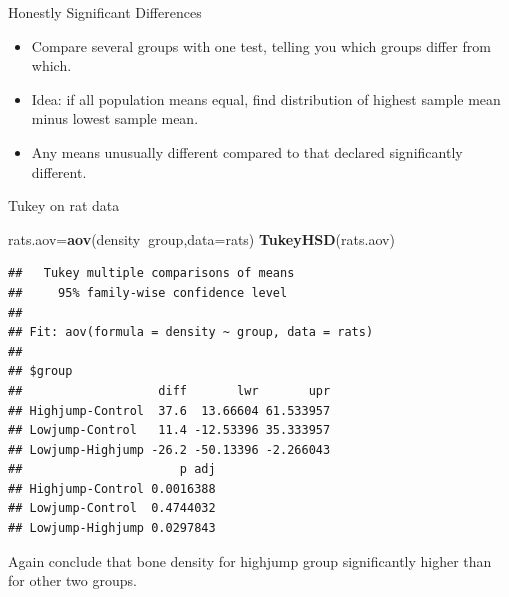 \documentclass[ignorenonframetext,]{beamer}
\newenvironment{Shaded}{\begin{snugshade}}{\end{snugshade}}
\newcommand{\DataTypeTok}[1]{\textcolor[rgb]{0.13,0.29,0.53}{#1}}
\newcommand{\KeywordTok}[1]{\textcolor[rgb]{0.13,0.29,0.53}{\textbf{#1}}}
\newcommand{\NormalTok}[1]{#1}
\newcommand{\OperatorTok}[1]{\textcolor[rgb]{0.81,0.36,0.00}{\textbf{#1}}}
\providecommand{\tightlist}{%
  \setlength{\itemsep}{0pt}\setlength{\parskip}{0pt}}
\begin{document}
\begin{frame}{Honestly Significant Differences}
\protect\hypertarget{honestly-significant-differences}{}

\begin{itemize}
\tightlist
\item
  Compare several groups with one test, telling you which groups differ
  from which.
\item
  Idea: if all population means equal, find distribution of highest
  sample mean minus lowest sample mean.
\item
  Any means unusually different compared to that declared significantly
  different.
\end{itemize}

\end{frame}

\begin{frame}[fragile]{Tukey on rat data}
\protect\hypertarget{tukey-on-rat-data}{}

\begin{Shaded}
\begin{Highlighting}[]
\NormalTok{rats.aov=}\KeywordTok{aov}\NormalTok{(density}\OperatorTok{~}\NormalTok{group,}\DataTypeTok{data=}\NormalTok{rats)}
\KeywordTok{TukeyHSD}\NormalTok{(rats.aov)}
\end{Highlighting}
\end{Shaded}

\begin{verbatim}
##   Tukey multiple comparisons of means
##     95% family-wise confidence level
## 
## Fit: aov(formula = density ~ group, data = rats)
## 
## $group
##                   diff       lwr       upr
## Highjump-Control  37.6  13.66604 61.533957
## Lowjump-Control   11.4 -12.53396 35.333957
## Lowjump-Highjump -26.2 -50.13396 -2.266043
##                      p adj
## Highjump-Control 0.0016388
## Lowjump-Control  0.4744032
## Lowjump-Highjump 0.0297843
\end{verbatim}

Again conclude that bone density for highjump group significantly higher
than for other two groups.

\end{frame}
\end{document}
